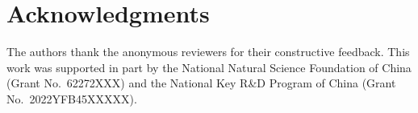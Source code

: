 \documentclass[preprint,12pt,3p]{elsarticle}
\begin{document}
\section*{Acknowledgments}

The authors thank the anonymous reviewers for their constructive feedback.
This work was supported in part by the National Natural Science Foundation
of China (Grant No.~62272XXX) and the National Key R\&D Program of China
(Grant No.~2022YFB45XXXXX).


\end{document}
